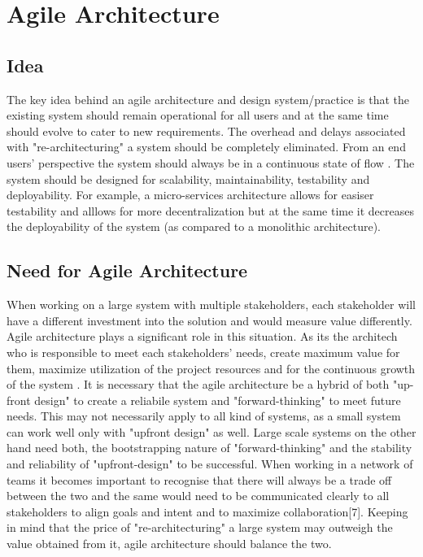 \documentclass[sigplan,screen]{acmart}
\begin{document}
\section{Agile Architecture}
\subsection{Idea}
The key idea behind an agile architecture and design system/practice is that the existing system should remain operational for all users and at the same time should evolve to cater to new requirements.
The overhead and delays associated with "re-architecturing" a system should be completely eliminated. From an end users' perspective the system should always be in a continuous state of flow \cite{b5}.
The system should be designed for scalability, maintainability, testability and deployability. For example, a micro-services architecture allows for easiser testability and alllows for more decentralization but at the same time it decreases the deployability of the system (as compared to a monolithic architecture).
\subsection{Need for Agile Architecture}
When working on a large system with multiple stakeholders, each stakeholder will have a different investment into the solution and would measure value differently.
Agile architecture plays a significant role in this situation. As its the architech who is responsible to meet each stakeholders' needs, create maximum value for them, maximize utilization of the project resources and for the continuous growth of the system \cite{b6}.
It is necessary that the agile architecture be a hybrid of both "up-front design" to create a reliabile system and "forward-thinking" to meet future needs. This may not necessarily apply to all kind of systems, as a small system can work well only with "upfront design" as well.
Large scale systems on the other hand need both, the bootstrapping nature of "forward-thinking" and the stability and reliability of "upfront-design" to be successful. When working in a network of teams it becomes important to recognise that there will always be a trade off between the two and the same would need to be communicated clearly to all stakeholders to align goals and intent and to maximize collaboration[7].
Keeping in mind that the price of "re-architecturing" a large system may outweigh the value obtained from it, agile architecture should balance the two.
\end{document}
